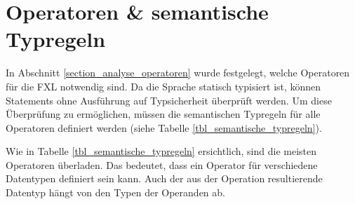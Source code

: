 \section{Operatoren \& semantische Typregeln}

In Abschnitt \ref{section_analyse_operatoren} wurde festgelegt, welche Operatoren für die FXL notwendig sind. Da die Sprache statisch typisiert ist, können Statements ohne Ausführung auf Typsicherheit überprüft werden. Um diese Überprüfung zu ermöglichen, müssen die semantischen Typregeln für alle Operatoren definiert werden (siehe Tabelle \ref{tbl_semantische_typregeln}).

Wie in Tabelle \ref{tbl_semantische_typregeln} ersichtlich, sind die meisten Operatoren überladen. Das bedeutet, dass ein Operator für verschiedene Datentypen definiert sein kann. Auch der aus der Operation resultierende Datentyp hängt von den Typen der Operanden ab. 

